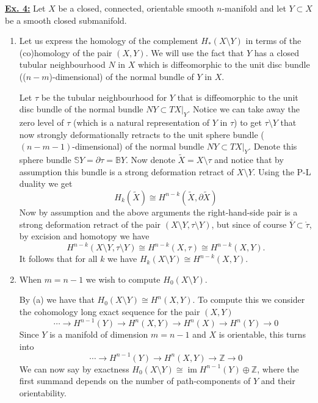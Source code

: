 \documentclass[a4paper, 12pt]{article}
\DeclareMathOperator{\im}{im}
\renewcommand{\S}{\mathbb{S}}
\newcommand{\B}{\mathbb{B}}
\newcommand{\Z}{\mathbb{Z}}
\newcommand{\iso}{\cong}
\newcommand{\closure}[1]{\overline{#1}}
\begin{document}
\underline{\textbf{Ex. 4:}}
Let $X$ be a closed, connected, orientable smooth $n$-manifold and let $Y \subset X$ be a smooth closed submanifold.

\begin{enumerate}[label=(\alph*)]
	\item Let us express the homology of the complement $H_*(X \setminus Y)$ in terms of the (co)homology of the pair $(X, Y)$. We will use the fact that $Y$ has a closed tubular neighbourhood $N$ in $X$ which is diffeomorphic to the unit disc bundle (($n-m$)-dimensional) of the normal bundle of $Y$ in $X$.
	
	Let $\tau$ be the tubular neighbourhood for $Y$ that is diffeomorphic to the unit disc bundle of the normal bundle $NY \subset TX|_Y$. Notice we can take away the zero level of $\tau$ (which is a natural representation of $Y$ in $\tau$) to get $\tau \setminus Y$ that now strongly deformationally retracts to the unit sphere bundle ($(n-m-1)$-dimensional) of the normal bundle $NY \subset TX|_Y$. Denote this sphere bundle $\S Y = \partial \tau = \B Y$. Now denote $\widetilde{X} = X \setminus \tau$ and notice that by assumption this bundle is a strong deformation retract of $X \setminus Y$. Using the P-L duality we get
	\[
	H_k(\widetilde{X}) \iso H^{n-k}(\widetilde{X}, \partial\widetilde{X})
	\]
	Now by assumption and the above arguments the right-hand-side pair is a strong deformation retract of the pair $(X \setminus Y, \tau\setminus Y)$, but since of course $\closure{Y} \subset \mathring{\tau}$, by excision and homotopy we have
	\[
	H^{n-k}(X \setminus Y, \tau \setminus Y) \iso H^{n-k}(X, \tau) \iso H^{n-k}(X, Y).
	\]
	It follows that for all $k$ we have $H_k(X\setminus Y) \iso H^{n-k}(X, Y)$.
	
	\item When $m = n-1$ we wish to compute $H_0(X \setminus Y)$.
	
	By (a) we have that $H_0(X\setminus Y) \iso H^{n}(X, Y)$. To compute this we consider the cohomology long exact sequence for the pair $(X, Y)$
	\[
	\cdots \xrightarrow{} H^{n-1}(Y) \xrightarrow{} H^{n}(X, Y) \xrightarrow{} H^{n}(X) \xrightarrow{} H^{n}(Y) \xrightarrow{} 0
	\]
	Since $Y$ is a manifold of dimension $m = n-1$ and $X$ is orientable, this turns into
	\[
	\cdots \xrightarrow{} H^{n-1}(Y) \xrightarrow{} H^{n}(X, Y) \xrightarrow{} \Z \xrightarrow{} 0
	\]
	We can now say by exactness $H_0(X \setminus Y) \iso \im H^{n-1}(Y) \oplus \Z$, where the first summand depends on the number of path-components of $Y$ and their orientability.
	

\end{enumerate}
\end{document}
